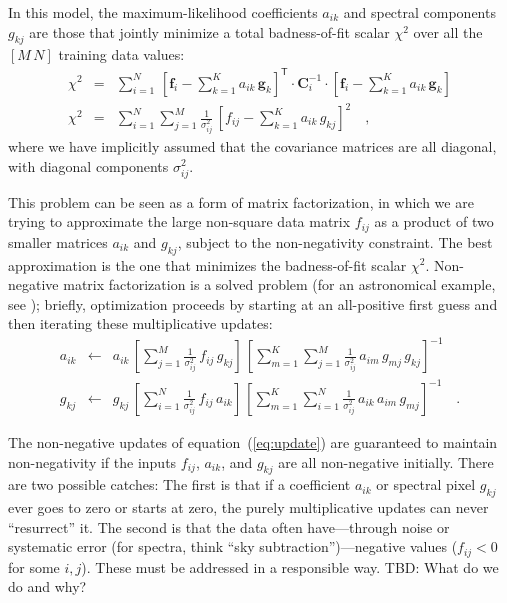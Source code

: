 \documentclass[preprint]{aastex}
\newcounter{address}
\newcommand{\mmatrix}[1]{\boldsymbol{#1}}
\newcommand{\inverse}[1]{{#1}^{-1}}
\newcommand{\transpose}[1]{{#1}^{\mathsf{T}}}
\newcommand{\covar}{\mmatrix{C}}
\newcommand{\fvec}{\mmatrix{f}}
\newcommand{\gvec}{\mmatrix{g}}
\newcommand{\invvar}{\inverse{\covar}}
\newcommand{\equationname}{equation}
\begin{document}
In this model, the maximum-likelihood coefficients $a_{ik}$ and
spectral components $g_{kj}$ are those that jointly minimize a total
badness-of-fit scalar $\chi^2$ over all the $[M\,N]$ training data
values:
\begin{eqnarray}\displaystyle
\chi^2 &=& \sum_{i=1}^N 
 \,\transpose{\left[\fvec_i - \sum_{k=1}^K a_{ik}\,\gvec_k\right]}
 \cdot\invvar_i\cdot\left[\fvec_i - \sum_{k=1}^K a_{ik}\,\gvec_k\right]
 \nonumber\\
\chi^2 &=& \sum_{i=1}^N \sum_{j=1}^M \frac{1}{\sigma_{ij}^2}
 \,\left[f_{ij} - \sum_{k=1}^K a_{ik}\,g_{kj}\right]^2
\quad ,
\end{eqnarray}
where we have implicitly assumed that the covariance matrices are all
diagonal, with diagonal components $\sigma_{ij}^2$.

This problem can be seen as a form of matrix factorization, in which
we are trying to approximate the large non-square data matrix $f_{ij}$
as a product of two smaller matrices $a_{ik}$ and $g_{kj}$, subject to
the non-negativity constraint.  The best approximation is the one that
minimizes the badness-of-fit scalar $\chi^2$.  Non-negative matrix
factorization is a solved problem (for an astronomical example, see
\citealt{kcorrect}); briefly, optimization proceeds by starting
at an all-positive first guess and then iterating these multiplicative
updates:
\begin{eqnarray}\displaystyle
a_{ik} &\leftarrow& a_{ik}
 \,\left[\sum_{j=1}^M\frac{1}{\sigma_{ij}^2}\,f_{ij}\,g_{kj}\right]
 \,\left[\sum_{m=1}^K\sum_{j=1}^M\frac{1}{\sigma_{ij}^2}\,a_{im}\,g_{mj}\,g_{kj}\right]^{-1}
\nonumber\\
g_{kj} &\leftarrow& g_{kj}
 \,\left[\sum_{i=1}^N\frac{1}{\sigma_{ij}^2}\,f_{ij}\,a_{ik}\right]
 \,\left[\sum_{m=1}^K\sum_{i=1}^N\frac{1}{\sigma_{ij}^2}\,a_{ik}\,a_{im}\,g_{mj}\right]^{-1}
\quad.\label{eq:update}
\end{eqnarray}

The non-negative updates of \equationname~(\ref{eq:update}) are
guaranteed to maintain non-negativity if the inputs $f_{ij}$,
$a_{ik}$, and $g_{kj}$ are all non-negative initially.  There are two
possible catches: The first is that if a coefficient $a_{ik}$ or
spectral pixel $g_{kj}$ ever goes to zero or starts at zero, the
purely multiplicative updates can never ``resurrect'' it.  The second
is that the data often have---through noise or systematic error (for
spectra, think ``sky subtraction'')---negative values ($f_{ij}<0$ for
some $i,j$).  These must be addressed in a responsible way.  TBD: What
do we do and why?
\end{document}
